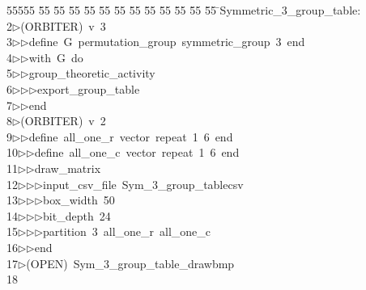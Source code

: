 %
%
\begin{tabbing}
55555 \= 55 \= 55 \= 55 \= 55 \= 55 \= 55 \= 55 \= 55 \= 55 \= 55 \= 55 \= 55 \= \>Symmetric\_3\_group\_table:\\[0pt]
2\>$\triangleright$\>(ORBITER)\ v\ 3\ \\[0pt]
3\>$\triangleright$\>$\triangleright$\>define\ G\ permutation\_group\ symmetric\_group\ 3\ end\ \\[0pt]
4\>$\triangleright$\>$\triangleright$\>with\ G\ do\ \\[0pt]
5\>$\triangleright$\>$\triangleright$\>group\_theoretic\_activity\ \\[0pt]
6\>$\triangleright$\>$\triangleright$\>$\triangleright$\>export\_group\_table\ \\[0pt]
7\>$\triangleright$\>$\triangleright$\>end\\[0pt]
8\>$\triangleright$\>(ORBITER)\ v\ 2\ \\[0pt]
9\>$\triangleright$\>$\triangleright$\>define\ all\_one\_r\ vector\ repeat\ 1\ 6\ end\ \\[0pt]
10\>$\triangleright$\>$\triangleright$\>define\ all\_one\_c\ vector\ repeat\ 1\ 6\ end\ \\[0pt]
11\>$\triangleright$\>$\triangleright$\>draw\_matrix\ \\[0pt]
12\>$\triangleright$\>$\triangleright$\>$\triangleright$\>input\_csv\_file\ Sym\_3\_group\_tablecsv\ \\[0pt]
13\>$\triangleright$\>$\triangleright$\>$\triangleright$\>box\_width\ 50\ \\[0pt]
14\>$\triangleright$\>$\triangleright$\>$\triangleright$\>bit\_depth\ 24\ \\[0pt]
15\>$\triangleright$\>$\triangleright$\>$\triangleright$\>partition\ 3\ all\_one\_r\ all\_one\_c\ \\[0pt]
16\>$\triangleright$\>$\triangleright$\>end\\[0pt]
17\>$\triangleright$\>(OPEN)\ Sym\_3\_group\_table\_drawbmp\\[0pt]
18\>\end{tabbing}
